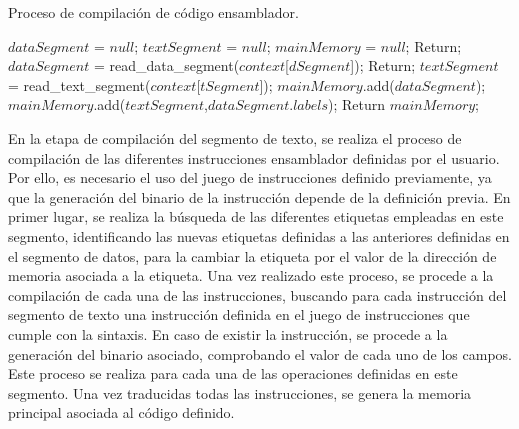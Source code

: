 \begin{algorithm}[h]
	\caption{Proceso de compilación de código ensamblador.}
	\label{alg:assembly_compiler_pseudocode}
  	\scriptsize
	\begin{algorithmic}[1]
		\State $dataSegment$ = $null$;
		\State $textSegment$ = $null$;
		\State $mainMemory$ = $null$;
			\State Return;
		\EndIf
		\State $dataSegment$ = read\_data\_segment($context$[$dSegment$]);
			\State Return;
		\EndIf
		\State $textSegment$ = read\_text\_segment($context$[$tSegment$]);
		\State $mainMemory$.add($dataSegment$);
		\State $mainMemory$.add($textSegment$,$dataSegment$.$labels$);
		\State Return $mainMemory$;
		\EndFunction
\end{algorithmic}
\end{algorithm}

En la etapa de compilación del segmento de texto, se realiza el proceso de compilación de las diferentes instrucciones ensamblador definidas por el usuario. Por ello, es necesario el uso del juego de instrucciones definido previamente, ya que la generación del binario de la instrucción depende de la definición previa. En primer lugar, se realiza la búsqueda de las diferentes etiquetas empleadas en este segmento, identificando las nuevas etiquetas definidas a las anteriores definidas en el segmento de datos, para la cambiar la etiqueta por el valor de la dirección de memoria asociada a la etiqueta. Una vez realizado este proceso, se procede a la compilación de cada una de las instrucciones, buscando para cada instrucción del segmento de texto una instrucción definida en el juego de instrucciones que cumple con la sintaxis. En caso de existir la instrucción, se procede a la generación del binario asociado, comprobando el valor de cada uno de los campos. Este proceso se realiza para cada una de las operaciones definidas en este segmento. Una vez traducidas todas las instrucciones, se genera la memoria principal asociada al código definido.

